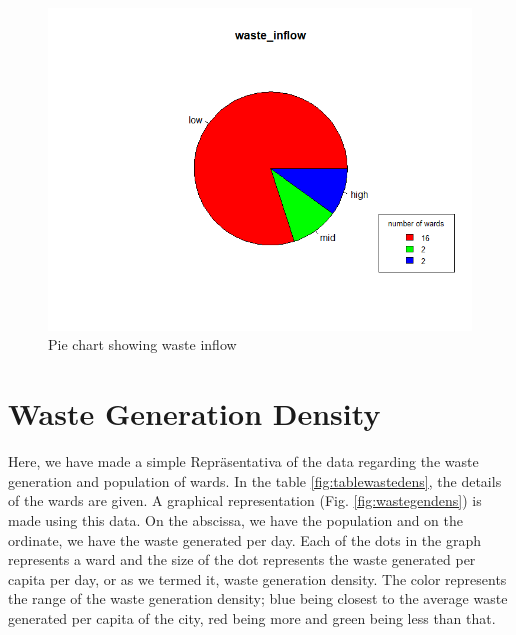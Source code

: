 \documentclass[12pt,a4paper]{report}
\begin{document}
\begin{figure}[H]
	\centering
	\includegraphics[width=1\linewidth]{waste_inflow}
	\caption{Pie chart showing waste inflow}
	\label{fig:wasteinflow}
\end{figure}

\section{Waste Generation Density}

Here, we have made a simple Repräsentativa of the data regarding the waste generation and population of wards. In the table \ref{fig:tablewastedens}, the details of the wards are given. A graphical representation (Fig. \ref{fig:wastegendens}) is made using this data. On the abscissa, we have the population and on the ordinate, we have the waste generated per day. Each of the dots in the graph represents a ward and the size of the dot represents the waste generated per capita per day, or as we termed it, waste generation density. The color represents the range of the waste generation density; blue being closest to the average waste generated per capita of the city, red being more and green being less than that.
\end{document}
